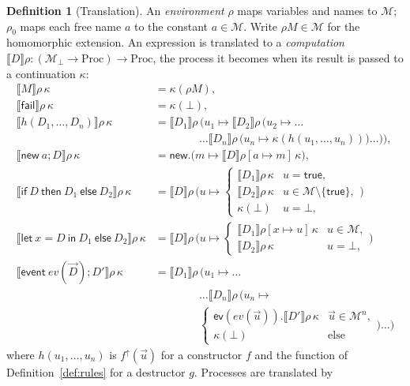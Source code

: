 \documentclass[11pt]{article}
\theoremstyle{definition}
\newtheorem{definition}{Definition}[section]
\theoremstyle{plain}
\theoremstyle{remark}
\newcommand{\Proc}{\mathrm{Proc}}
\newcommand{\sem}[1]{\llbracket #1 \rrbracket}
\begin{document}
\begin{definition}[Translation]\label{def:translation}
An \emph{environment} $\rho$ maps variables and names to $\mathcal{M}$; $\rho_0$ maps each free name $a$ to the constant $a\in\mathcal{M}$. Write $\rho M\in\mathcal{M}$ for the homomorphic extension. An expression is translated to a \emph{computation} $\sem{D}\rho:(\mathcal{M}_{\bot}\to\Proc)\to\Proc$, the process it becomes when its result is passed to a continuation $\kappa$:
\begin{align*}
\sem{M}\rho\,\kappa&=\kappa(\rho M),\\
\sem{\mathsf{fail}}\rho\,\kappa&=\kappa(\bot),\\
\sem{h(D_1,\dots,D_n)}\rho\,\kappa&=\sem{D_1}\rho\,\big(u_1\mapsto\sem{D_2}\rho\,\big(u_2\mapsto\dots\\
&\qquad\qquad\dots\sem{D_n}\rho\,\big(u_n\mapsto\kappa(h(u_1,\dots,u_n))\big)\dots\big)\big),\\
\sem{\mathsf{new}\ a;D}\rho\,\kappa&=\mathsf{new}.\big(m\mapsto\sem{D}\rho[a\mapsto m]\,\kappa\big),\\
\sem{\mathsf{if}\ D\ \mathsf{then}\ D_1\ \mathsf{else}\ D_2}\rho\,\kappa&=\sem{D}\rho\,\Big(u\mapsto\begin{cases}\sem{D_1}\rho\,\kappa&u=\mathsf{true},\\\sem{D_2}\rho\,\kappa&u\in\mathcal{M}\setminus\{\mathsf{true}\},\\\kappa(\bot)&u=\bot,\end{cases}\Big)\\
\sem{\mathsf{let}\ x=D\ \mathsf{in}\ D_1\ \mathsf{else}\ D_2}\rho\,\kappa&=\sem{D}\rho\,\Big(u\mapsto\begin{cases}\sem{D_1}\rho[x\mapsto u]\,\kappa&u\in\mathcal{M},\\\sem{D_2}\rho\,\kappa&u=\bot,\end{cases}\Big)\\
\sem{\mathsf{event}\ ev(\vec D);D'}\rho\,\kappa&=\sem{D_1}\rho\,\big(u_1\mapsto\dots\\
&\qquad\qquad\dots\sem{D_n}\rho\,\big(u_n\mapsto\\
&\qquad\qquad\begin{cases}\mathsf{ev}(ev(\vec u)).\sem{D'}\rho\,\kappa&\vec u\in\mathcal{M}^n,\\\kappa(\bot)&\text{else}\end{cases}\big)\dots\big)
\end{align*}
where $h(u_1,\dots,u_n)$ is $f^{\uparrow}(\vec u)$ for a constructor $f$ and the function of Definition~\ref{def:rules} for a destructor $g$. Processes are translated by

\end{definition}
\end{document}
